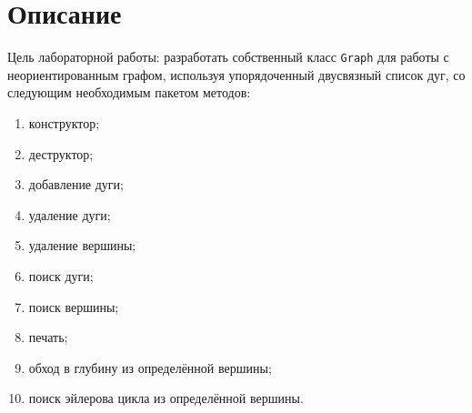 \section{Описание}


Цель лабораторной работы: разработать собственный класс \texttt{Graph} для работы с неориентированным графом, используя упорядоченный двусвязный список дуг, со следующим необходимым пакетом методов:
\begin{enumerate}
    \item конструктор;
    \item деструктор;
    \item добавление дуги;
    \item удаление дуги;
    \item удаление вершины;
    \item поиск дуги;
    \item поиск вершины;
    \item печать;
    \item обход в глубину из определённой вершины;
    \item поиск эйлерова цикла из определённой вершины.
\end{enumerate}

\newpage